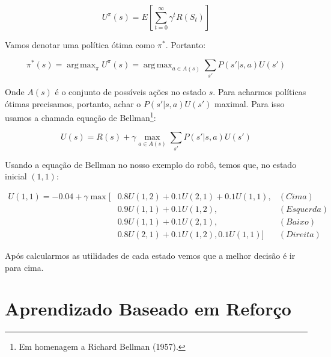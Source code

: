 \documentclass[a4paper,10pt]{article}
\DeclareMathOperator*{\argmax}{arg\,max}
\theoremstyle{plain}
\begin{document}
\begin{equation*}
  U^\pi(s) = E\left[\sum_{t=0}^\infty \gamma^t R(S_t)\right]
\end{equation*}

Vamos denotar uma política ótima como $\pi^*$. Portanto:

\begin{equation*}
  \pi^*(s) = \argmax_\pi U^\pi(s) = \argmax_{a \in A(s)} \sum_{s'} P(s'|s,a)U(s')
\end{equation*}

Onde $A(s)$ é o conjunto de possíveis ações no estado $s$. Para acharmos políticas ótimas
precisamos, portanto, achar o $P(s'|s,a)U(s')$ maximal. Para isso usamos a chamada equação de
Bellman\footnote{Em homenagem a Richard Bellman (1957).}:

\begin{equation*}
  U(s) = R(s) + \gamma \max_{a \in A(s)} \sum_{s'} P(s'|s,a)U(s')
\end{equation*}

Usando a equação de Bellman no nosso exemplo do robô, temos que, no estado inicial $(1, 1)$:

\begin{align*}
  U(1, 1) = -0.04 + \gamma \max[&0.8 U(1, 2) + 0.1 U(2, 1) + 0.1 U(1, 1), &(Cima) \\
                                &0.9 U(1, 1) + 0.1 U(1, 2), &(Esquerda) \\
                                &0.9 U(1, 1) + 0.1 U(2, 1), &(Baixo) \\
                                &0.8 U(2, 1) + 0.1 U(1, 2), 0.1U(1, 1)] &(Direita)
\end{align*}

Após calcularmos as utilidades de cada estado vemos que a melhor decisão é ir para cima.

\section{Aprendizado Baseado em Reforço}

\newpage
\printbibliography
\end{document}
